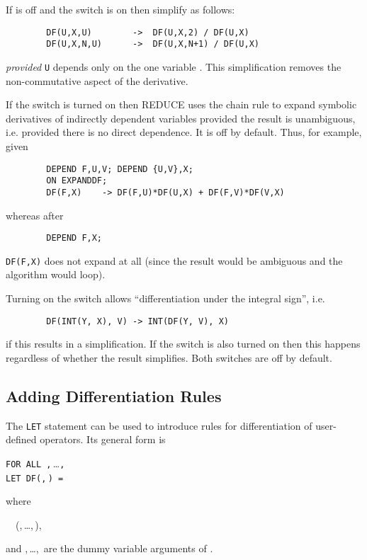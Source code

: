 If  is off and the switch 
is on then simplify as follows:
\begin{verbatim}
        DF(U,X,U)        ->  DF(U,X,2) / DF(U,X)
        DF(U,X,N,U)      ->  DF(U,X,N+1) / DF(U,X)
\end{verbatim}
\emph{provided} \texttt{U} depends only on the one variable .
This simplification removes the non-commutative aspect of the derivative.

\hypertarget{switch:EXPANDDF}{}
If the switch  is turned on then REDUCE uses
the chain rule to expand symbolic derivatives of indirectly dependent variables
provided the result is unambiguous, i.e. provided there is no direct dependence.
It is off by default.  Thus, for example, given
\newpage
\begin{verbatim}
        DEPEND F,U,V; DEPEND {U,V},X;
        ON EXPANDDF;
        DF(F,X)    -> DF(F,U)*DF(U,X) + DF(F,V)*DF(V,X)
\end{verbatim}
whereas after
\begin{verbatim}
        DEPEND F,X;
\end{verbatim}
\texttt{DF(F,X)} does not expand at all (since the result would be ambiguous
and the algorithm would loop).

\hypertarget{switch:ALLOWDFINT}{}
\hypertarget{switch:DFINT}{}
Turning on the switch  allows
``differentiation under the integral sign'', i.e.
\begin{verbatim}
        DF(INT(Y, X), V) -> INT(DF(Y, V), X)
\end{verbatim}
if this results in a simplification.  If the switch 
is also turned on then this happens regardless of whether the result
simplifies. Both switches are off by default.


\subsection{Adding Differentiation Rules}
\hypertarget{command:LETdf}{}

The \texttt{LET} statement can be used to introduce
rules for differentiation of user-defined operators.  Its general form is
\begin{syntaxtable}
  \texttt{FOR ALL }\texttt{,}\,\dots\texttt{,}\, \\
    \qquad \texttt{LET DF(}\texttt{,}\,\texttt{)
    = }
\end{syntaxtable}
where
\begin{syntax}
  \ \BNFprod\ (,\,\dots,\,),
\end{syntax}
and
,\,\dots,\, are the dummy variable arguments of
.

